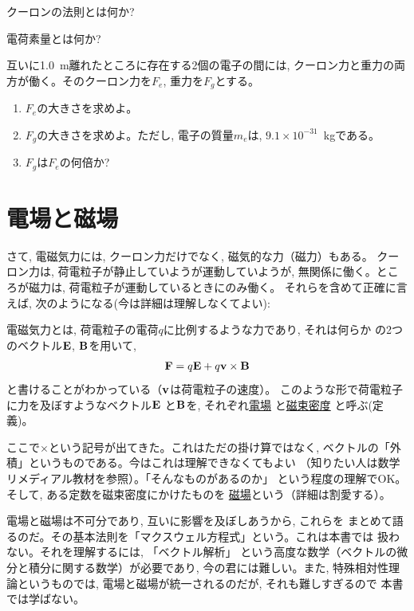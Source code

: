 \begin{q}\label{q:coulomb_law}
クーロンの法則とは何か?
\end{q}
\mv

\begin{q}\label{q:element_charge}
電荷素量とは何か?
\end{q}
\mv

\begin{q}\label{q:elec_grav_compare}
互いに1.0~m離れたところに存在する2個の電子の間には, 
クーロン力と重力の両方が働く。そのクーロン力を$F_e$, 重力を$F_g$とする。
\begin{enumerate}
\item $F_e$の大きさを求めよ。
\item $F_g$の大きさを求めよ。ただし, 電子の質量$m_e$は, $9.1\times10^{−31}$~kgである。
\item $F_g$は$F_e$の何倍か?
\end{enumerate}
\end{q}\mv


\section{電場と磁場}

さて, 電磁気力には, クーロン力だけでなく, 磁気的な力（磁力）もある。
クーロン力は, 荷電粒子が静止していようが運動していようが, 
無関係に働く。ところが磁力は, 荷電粒子が運動しているときにのみ働く。
それらを含めて正確に言えば, 次のようになる(今は詳細は理解しなくてよい):

電磁気力とは, 荷電粒子の電荷$q$に比例するような力であり, それは何らか
の2つのベクトル${\bf E}$, ${\bf B}$を用いて, 
\begin{eqnarray}
{\bf F}=q{\bf E}+q{\bf v}\times{\bf B}\label{eq:LorentsForce}
\end{eqnarray}
と書けることがわかっている（${\bf v}$は荷電粒子の速度）。
このような形で荷電粒子に力を及ぼすようなベクトル${\bf E}$
と${\bf B}$を, それぞれ\underline{電場}
と\underline{磁束密度}
と呼ぶ(定義)。

ここで$\times$という記号が出てきた。これはただの掛け算ではなく, 
ベクトルの「外積」というものである。今はこれは理解できなくてもよい
（知りたい人は数学リメディアル教材を参照）。「そんなものがあるのか」
という程度の理解でOK。そして, ある定数を磁束密度にかけたものを
\underline{磁場}という（詳細は割愛する）。\mv

電場と磁場は不可分であり, 互いに影響を及ぼしあうから, これらを
まとめて語るのだ。その基本法則を「マクスウェル方程式」という。これは本書では
扱わない。それを理解するには, 「ベクトル解析」
という高度な数学（ベクトルの微分と積分に関する数学）が必要であり, 
今の君には難しい。また, 特殊相対性理論というものでは, 
電場と磁場が統一されるのだが, それも難しすぎるので
本書では学ばない。\mv

